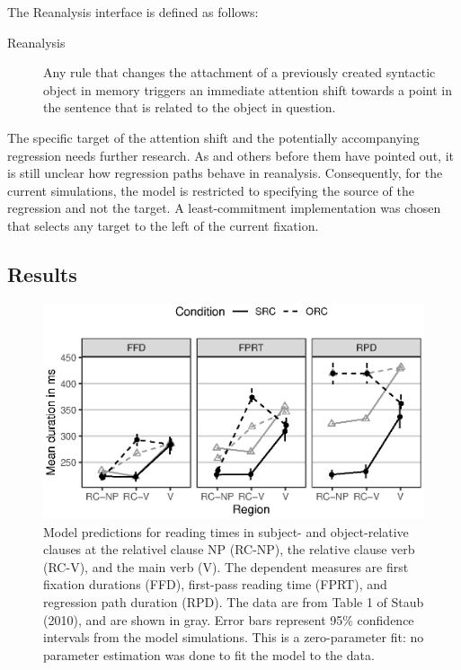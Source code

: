 \documentclass{cambridge7A}\usepackage[]{graphicx}\usepackage[]{color}
\makeatletter
\def\maxwidth{ %
  \ifdim\Gin@nat@width>\linewidth
    \linewidth
  \else
    \Gin@nat@width
  \fi
}
\newenvironment{knitrout}{}{} %
\makeatother
\begin{document}
The Reanalysis interface is defined as follows:
\begin{description}
  \item[Reanalysis] Any rule that changes the attachment of a previously created syntactic object in memory triggers an immediate attention shift towards a point in the sentence that is related to the object in question. 
\end{description}

The specific target of the attention shift and the potentially accompanying regression needs further research. As \cite{MalsburgVasishth2011,MalsburgEtAl2015} and others before them \citep{Meseguer2002,greenmitchellJML06} have pointed out, it is still unclear how regression paths behave in reanalysis.
Consequently, for the current simulations, the model is restricted to specifying the source of the regression and not the target. A least-commitment implementation was chosen that selects any target to the left of the current fixation.

\subsection{Results}

\begin{figure}[tb]
  \centering
\begin{knitrout}
\color{fgcolor}

{\centering \includegraphics[width=\maxwidth]{figures/fig-staub10modelRT-1} 

}



\end{knitrout}
\caption[Model predictions for reading times in subject- and object-relative clauses.]{Model predictions for reading times in subject- and object-relative clauses at the relativel clause NP (RC-NP), the relative clause verb (RC-V), and the  main verb (V). The dependent measures are first fixation durations (FFD), first-pass reading time (FPRT), and regression path duration (RPD). The data are from Table 1 of Staub (2010), and are shown in gray. Error bars represent 95\% confidence intervals from the model simulations. This is a zero-parameter fit: no parameter estimation was done to fit the model to the data.} \label{fig:staubmodel:rt}
\end{figure}
\end{document}
